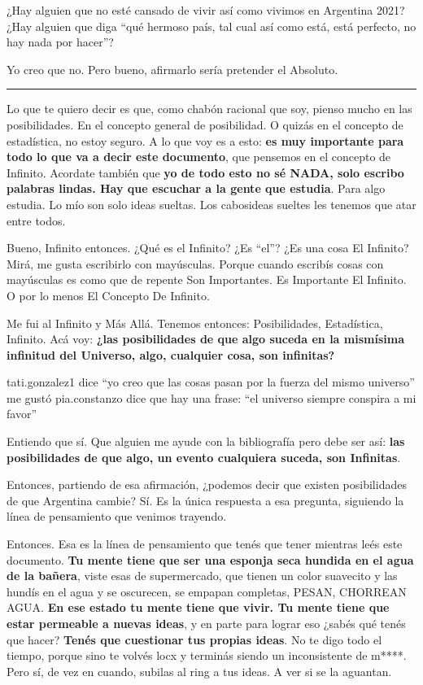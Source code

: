 \documentclass[
]{book}
\begin{document}
¿Hay alguien que no esté cansado de vivir así como vivimos en Argentina 2021? ¿Hay alguien que diga ``qué hermoso país, tal cual así como está, está perfecto, no hay nada por hacer''?

Yo creo que no. Pero bueno, afirmarlo sería pretender el Absoluto.

\begin{center}\rule{0.5\linewidth}{0.5pt}\end{center}

Lo que te quiero decir es que, como chabón racional que soy, pienso mucho en las posibilidades. En el concepto general de posibilidad. O quizás en el concepto de estadística, no estoy seguro. A lo que voy es a esto: \textbf{es muy importante para todo lo que va a decir este documento}, que pensemos en el concepto de Infinito. Acordate también que \textbf{yo de todo esto no sé NADA, solo escribo palabras lindas. Hay que escuchar a la gente que estudia}. Para algo estudia. Lo mío son solo ideas sueltas. Los cabosideas sueltes les tenemos que atar entre todos.

Bueno, Infinito entonces. ¿Qué es el Infinito? ¿Es ``el''? ¿Es una cosa El Infinito? Mirá, me gusta escribirlo con mayúsculas. Porque cuando escribís cosas con mayúsculas es como que de repente Son Importantes. Es Importante El Infinito. O por lo menos El Concepto De Infinito.

Me fui al Infinito y Más Allá. Tenemos entonces: Posibilidades, Estadística, Infinito. Acá voy: \textbf{¿las posibilidades de que algo suceda en la mismísima infinitud del Universo, algo, cualquier cosa, son infinitas?}

tati.gonzalez1 dice ``yo creo que las cosas pasan por la fuerza del mismo universo'' me gustó
pia.constanzo dice que hay una frase: ``el universo siempre conspira a mi favor''

Entiendo que sí. Que alguien me ayude con la bibliografía pero debe ser así: \textbf{las posibilidades de que algo, un evento cualquiera suceda, son Infinitas}.

Entonces, partiendo de esa afirmación, ¿podemos decir que existen posibilidades de que Argentina cambie? Sí. Es la única respuesta a esa pregunta, siguiendo la línea de pensamiento que venimos trayendo.

Entonces. Esa es la línea de pensamiento que tenés que tener mientras leés este documento. \textbf{Tu mente tiene que ser una esponja seca hundida en el agua de la bañera}, viste esas de supermercado, que tienen un color suavecito y las hundís en el agua y se oscurecen, se empapan completas, PESAN, CHORREAN AGUA. \textbf{En ese estado tu mente tiene que vivir. Tu mente tiene que estar permeable a nuevas ideas}, y en parte para lograr eso ¿sabés qué tenés que hacer? \textbf{Tenés que cuestionar tus propias ideas}. No te digo todo el tiempo, porque sino te volvés locx y terminás siendo un inconsistente de m****. Pero sí, de vez en cuando, subilas al ring a tus ideas. A ver si se la aguantan.
\end{document}
